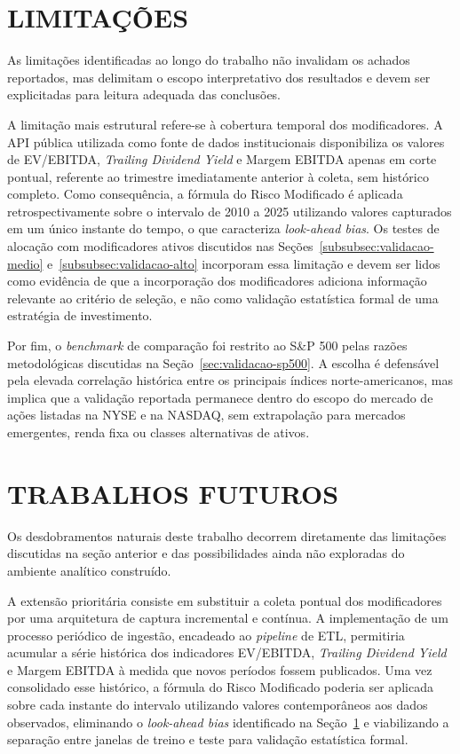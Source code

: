 \section{LIMITAÇÕES}
\label{sec:limitacoes}

As limitações identificadas ao longo do trabalho não invalidam os achados reportados, mas delimitam o escopo interpretativo dos resultados e devem ser explicitadas para leitura adequada das conclusões.

A limitação mais estrutural refere-se à cobertura temporal dos modificadores. A API pública utilizada como fonte de dados institucionais disponibiliza os valores de EV/EBITDA, \textit{Trailing Dividend Yield} e Margem EBITDA apenas em corte pontual, referente ao trimestre imediatamente anterior à coleta, sem histórico completo. Como consequência, a fórmula do Risco Modificado é aplicada retrospectivamente sobre o intervalo de 2010 a 2025 utilizando valores capturados em um único instante do tempo, o que caracteriza \textit{look-ahead bias}. Os testes de alocação com modificadores ativos discutidos nas Seções~\ref{subsubsec:validacao-medio} e~\ref{subsubsec:validacao-alto} incorporam essa limitação e devem ser lidos como evidência de que a incorporação dos modificadores adiciona informação relevante ao critério de seleção, e não como validação estatística formal de uma estratégia de investimento.

Por fim, o \textit{benchmark} de comparação foi restrito ao S\&P 500 pelas razões metodológicas discutidas na Seção~\ref{sec:validacao-sp500}. A escolha é defensável pela elevada correlação histórica entre os principais índices norte-americanos, mas implica que a validação reportada permanece dentro do escopo do mercado de ações listadas na NYSE e na NASDAQ, sem extrapolação para mercados emergentes, renda fixa ou classes alternativas de ativos.

\section{TRABALHOS FUTUROS}
\label{sec:trabalhos-futuros}

Os desdobramentos naturais deste trabalho decorrem diretamente das limitações discutidas na seção anterior e das possibilidades ainda não exploradas do ambiente analítico construído.

A extensão prioritária consiste em substituir a coleta pontual dos modificadores por uma arquitetura de captura incremental e contínua. A implementação de um processo periódico de ingestão, encadeado ao \textit{pipeline} de ETL, permitiria acumular a série histórica dos indicadores EV/EBITDA, \textit{Trailing Dividend Yield} e Margem EBITDA à medida que novos períodos fossem publicados. Uma vez consolidado esse histórico, a fórmula do Risco Modificado poderia ser aplicada sobre cada instante do intervalo utilizando valores contemporâneos aos dados observados, eliminando o \textit{look-ahead bias} identificado na Seção~\ref{sec:limitacoes} e viabilizando a separação entre janelas de treino e teste para validação estatística formal.

